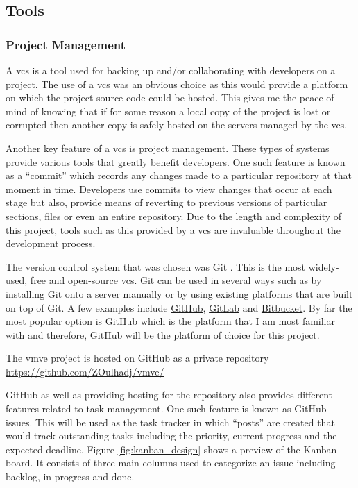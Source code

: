 \documentclass[11pt]{article}
\begin{document}
\subsection{Tools}
\subsubsection{Project Management}
A \gls*{vcs} is a tool used for backing up and/or collaborating with developers
on a project. The use of a \gls*{vcs} was an obvious choice as this would provide
a platform on which the project source code could be hosted. This gives me the
peace of mind of knowing that if for some reason a local copy of the project is
lost or corrupted then another copy is safely hosted on the servers managed by
the \gls*{vcs}.

Another key feature of a \gls*{vcs} is project management. These types of systems
provide various tools that greatly benefit developers. One such feature is known
as a ``commit'' which records any changes made to a particular repository at
that moment in time. Developers use commits to view changes that occur at each
stage but also, provide means of reverting to previous versions of particular
sections, files or even an entire repository. Due to the length and complexity
of this project, tools such as this provided by a \gls*{vcs} are invaluable
throughout the development process.

The version control system that was chosen was Git \cite{gitvcs}. This is the
most widely-used, free and open-source \gls*{vcs}. Git can be used in several
ways such as by installing Git onto a server manually or by using existing
platforms that are built on top of Git. A few examples include
\href{http://github.com}{GitHub}, \href{http://gitlab.com}{GitLab} and
\href{https://bitbucket.org/}{Bitbucket}. By far the most popular option is
GitHub which is the platform that I am most familiar with and therefore, GitHub
will be the platform of choice for this project.


The \gls*{vmve} project is hosted on GitHub as a private repository
\url{https://github.com/ZOulhadj/vmve/}


GitHub as well as providing hosting for the repository also provides different
features related to task management. One such feature is known as GitHub issues.
This will be used as the task tracker in which ``posts'' are created that would
track outstanding tasks including the priority, current progress and the
expected deadline. Figure \ref{fig:kanban_design} shows a preview of the Kanban
board. It consists of three main columns used to categorize an issue including
backlog, in progress and done. 
\end{document}

